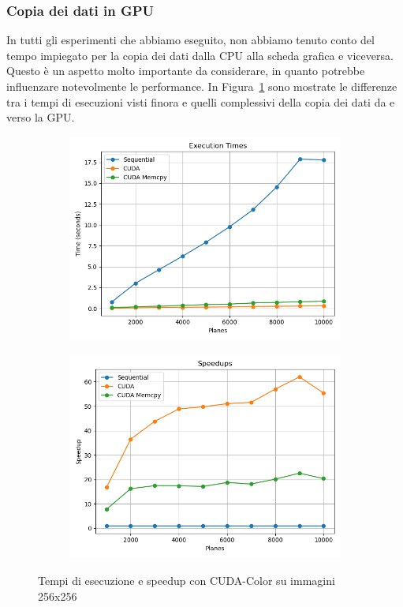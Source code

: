 \subsubsection{Copia dei dati in GPU}
In tutti gli esperimenti che abbiamo eseguito, non abbiamo tenuto conto del tempo impiegato per la copia dei dati
dalla CPU alla scheda grafica e viceversa.
Questo è un aspetto molto importante da considerare, in quanto potrebbe influenzare notevolmente le performance.
In Figura~\ref{fig:cuda_memcpy} sono mostrate le differenze tra i tempi di esecuzioni visti finora e quelli complessivi
della copia dei dati da e verso la GPU.
\begin{figure}[H]
    \centering
    \begin{subfigure}{0.49\textwidth}
        \centering
        \includegraphics[width=\textwidth]{../results/plots/256/cuda_memcpy_times}
    \end{subfigure}
    \begin{subfigure}{0.49\textwidth}
        \centering
        \includegraphics[width=\textwidth]{../results/plots/256/cuda_memcpy_speedup}
    \end{subfigure}
    \caption{Tempi di esecuzione e speedup con CUDA-Color su immagini 256x256}
    \label{fig:cuda_memcpy}
\end{figure}
